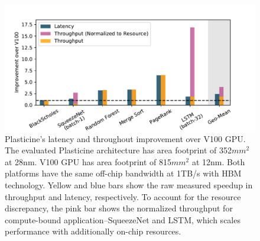 \begin{figure}
\centering
\includegraphics[width=1\textwidth]{figs/slide_gpu.pdf}
\caption[Performance comparison with V100 GPU]{
  Plasticine's latency and throughout improvement over V100 GPU.
  The evaluated Plasticine architecture has area footprint of 352$mm^2$ at 28nm.
  V100 GPU has area footprint of 815$mm^2$ at 12nm.
  Both platforms have the same off-chip bandwidth at 1TB/s with HBM technology.
  Yellow and blue bars show the raw measured speedup in throughput and latency, respectively.
  To account for the resource discrepancy, the pink bar shows the normalized throughput
  for compute-bound application--SqueezeNet and LSTM, which scales performance with additionally
  on-chip resources.
}
\label{fig:peakutil}
\end{figure}
